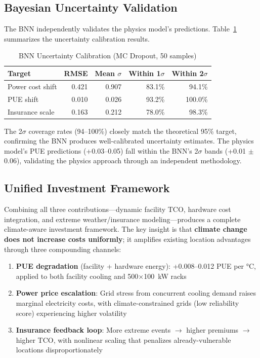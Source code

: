 \documentclass[12pt,a4paper]{article}
\begin{document}
\subsection{Bayesian Uncertainty Validation}

The BNN independently validates the physics model's predictions. Table~\ref{tab:bnn_calibration} summarizes the uncertainty calibration results.

\begin{table}[H]
\centering
\caption{BNN Uncertainty Calibration (MC Dropout, 50 samples)}
\label{tab:bnn_calibration}
\small
\begin{tabular}{lrrrr}
\toprule
\textbf{Target} & \textbf{RMSE} & \textbf{Mean $\sigma$} & \textbf{Within 1$\sigma$} & \textbf{Within 2$\sigma$} \\
\midrule
Power cost shift  & 0.421 & 0.907 & 83.1\% & 94.1\% \\
PUE shift         & 0.010 & 0.026 & 93.2\% & 100.0\% \\
Insurance scale   & 0.163 & 0.212 & 78.0\% & 98.3\% \\
\bottomrule
\end{tabular}
\end{table}

The 2$\sigma$ coverage rates (94--100\%) closely match the theoretical 95\% target, confirming the BNN produces well-calibrated uncertainty estimates. The physics model's PUE predictions (+0.03--0.05) fall within the BNN's 2$\sigma$ bands (+0.01 $\pm$ 0.06), validating the physics approach through an independent methodology.

\subsection{Unified Investment Framework}

Combining all three contributions—dynamic facility TCO, hardware cost integration, and extreme weather/insurance modeling—produces a complete climate-aware investment framework. The key insight is that \textbf{climate change does not increase costs uniformly}; it amplifies existing location advantages through three compounding channels:

\begin{enumerate}
    \item \textbf{PUE degradation} (facility + hardware energy): +0.008--0.012 PUE per °C, applied to both facility cooling and 500$\times$100~kW racks
    \item \textbf{Power price escalation}: Grid stress from concurrent cooling demand raises marginal electricity costs, with climate-constrained grids (low reliability score) experiencing higher volatility
    \item \textbf{Insurance feedback loop}: More extreme events $\rightarrow$ higher premiums $\rightarrow$ higher TCO, with nonlinear scaling that penalizes already-vulnerable locations disproportionately
\end{enumerate}
\end{document}
